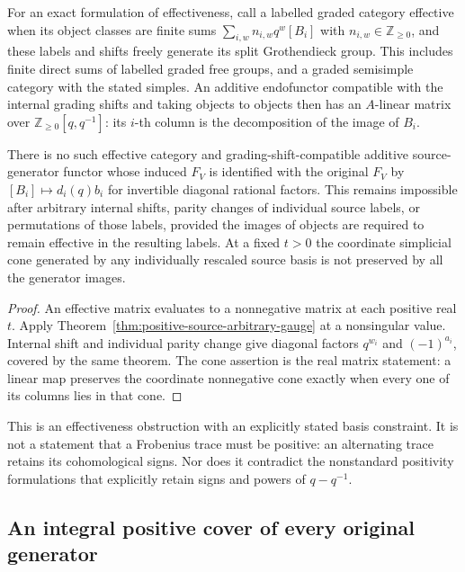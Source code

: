 For an exact formulation of effectiveness, call a labelled graded
category effective when its object classes are finite sums
$\sum_{i,w}n_{i,w}q^w[B_i]$ with $n_{i,w}\in\mathbb Z_{\geq0}$,
and these labels and shifts freely generate its split Grothendieck
group. This includes finite direct sums of labelled graded free
groups, and a graded semisimple category with the stated simples.
An additive endofunctor compatible with the internal grading shifts
and taking objects to objects then has an $A$-linear matrix
over $\mathbb Z_{\geq0}[q,q^{-1}]$: its $i$-th column is the
decomposition of the image of $B_i$.

\begin{corollary}\label{cor:positive-source-effective}
There is no such effective category and grading-shift-compatible
additive source-generator
functor whose induced $F_V$ is identified with the original $F_V$
by $[B_i]\mapsto d_i(q)b_i$ for invertible diagonal rational factors.
This remains impossible after arbitrary internal shifts, parity
changes of individual source labels, or permutations of those labels,
provided the images of objects are required to remain effective in
the resulting labels. At a fixed $t>0$ the coordinate simplicial cone
generated by any individually rescaled source basis is not preserved
by all the generator images.
\end{corollary}
\begin{proof}
An effective matrix evaluates to a nonnegative matrix at each positive
real $t$. Apply Theorem~\ref{thm:positive-source-arbitrary-gauge} at
a nonsingular value. Internal shift and individual parity change
give diagonal factors $q^{w_i}$ and $(-1)^{a_i}$, covered by the
same theorem. The cone assertion is the real matrix statement:
a linear map preserves the coordinate nonnegative cone exactly when
every one of its columns lies in that cone.
\end{proof}

This is an effectiveness obstruction with an explicitly stated
basis constraint. It is not a statement that a Frobenius trace must
be positive: an alternating trace retains its cohomological signs.
Nor does it contradict the nonstandard positivity formulations that
explicitly retain signs and powers of $q-q^{-1}$.

\subsection{An integral positive cover of every original generator}

